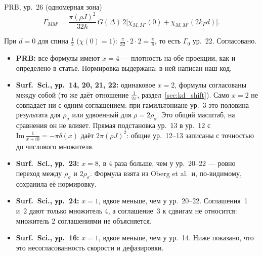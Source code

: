 \begin{paperbox}{PRB, ур.~26 (одномерная зона)}
\[
\Gamma_{MM'}=\frac{\pi(\rho J)^2}{32\hbar}\,G(\Delta)\,2\big[\chi_{M,M'}(0)+\chi_{M,M'}(2k_Fd)\big].
\]
\end{paperbox}
\begin{cmpbox}
При $d=0$ для спина $\tfrac12$ ($\chi(0)=1$): $\tfrac{\pi}{32}\cdot2\cdot2=\tfrac\pi8$, то есть $\Gamma_0$ ур.~22.
Согласовано.
\end{cmpbox}

\begin{cmpbox}
\begin{itemize}
\item \textbf{PRB:} все формулы имеют $x=4$ --- плотность на обе проекции, как и
  определено в статье. Нормировка выдержана; в ней написан наш код.
\item \textbf{Surf.\ Sci., ур.~14, 20, 21, 22:} одинаковое $x=2$, формулы согласованы
  между собой (то же даёт отношение $\tfrac1{2\pi}$, раздел~\ref{sec:kd_shift}). Само
  $x=2$ не совпадает ни с одним соглашением: при гамильтониане ур.~3 это
  половина результата для $\rho_\sigma$ или удвоенный для $\rho=2\rho_\sigma$. Это общий
  масштаб, на сравнения он не влияет. Прямая подстановка ур.~13 в ур.~12 с
  $\mathrm{Im}\,\tfrac1{x+i0}=-\pi\delta(x)$ даёт $2\pi(\rho J)^2$: общие ур.~12--13 записаны с
  точностью до числового множителя.
\item \textbf{Surf.\ Sci., ур.~23:} $x=8$, в 4 раза больше, чем у ур.~20--22 --- ровно
  переход между $\rho_\sigma$ и $2\rho_\sigma$. Формула взята из Oberg et al.\ и,
  по-видимому, сохранила её нормировку.
\item \textbf{Surf.\ Sci., ур.~24:} $x=1$, вдвое меньше, чем у ур.~20--22. Соглашения~1
  и~2 дают только множитель 4, а соглашение~3 к сдвигам не относится:
  множитель 2 соглашениями не объясняется.
\item \textbf{Surf.\ Sci., ур.~16:} $x=1$, вдвое меньше, чем у ур.~14. Ниже показано,
  что это несогласованность скорости и дефазировки.
\end{itemize}
\end{cmpbox}

